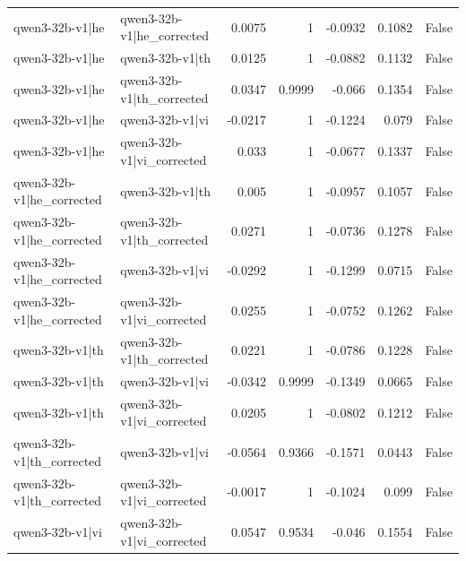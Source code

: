 \begin{table}
\begin{tabular}{l l r r r r l}
qwen3-32b-v1|he & qwen3-32b-v1|he_corrected & 0.0075 & 1 & -0.0932 & 0.1082 & False \\
qwen3-32b-v1|he & qwen3-32b-v1|th & 0.0125 & 1 & -0.0882 & 0.1132 & False \\
qwen3-32b-v1|he & qwen3-32b-v1|th_corrected & 0.0347 & 0.9999 & -0.066 & 0.1354 & False \\
qwen3-32b-v1|he & qwen3-32b-v1|vi & -0.0217 & 1 & -0.1224 & 0.079 & False \\
qwen3-32b-v1|he & qwen3-32b-v1|vi_corrected & 0.033 & 1 & -0.0677 & 0.1337 & False \\
qwen3-32b-v1|he_corrected & qwen3-32b-v1|th & 0.005 & 1 & -0.0957 & 0.1057 & False \\
qwen3-32b-v1|he_corrected & qwen3-32b-v1|th_corrected & 0.0271 & 1 & -0.0736 & 0.1278 & False \\
qwen3-32b-v1|he_corrected & qwen3-32b-v1|vi & -0.0292 & 1 & -0.1299 & 0.0715 & False \\
qwen3-32b-v1|he_corrected & qwen3-32b-v1|vi_corrected & 0.0255 & 1 & -0.0752 & 0.1262 & False \\
qwen3-32b-v1|th & qwen3-32b-v1|th_corrected & 0.0221 & 1 & -0.0786 & 0.1228 & False \\
qwen3-32b-v1|th & qwen3-32b-v1|vi & -0.0342 & 0.9999 & -0.1349 & 0.0665 & False \\
qwen3-32b-v1|th & qwen3-32b-v1|vi_corrected & 0.0205 & 1 & -0.0802 & 0.1212 & False \\
qwen3-32b-v1|th_corrected & qwen3-32b-v1|vi & -0.0564 & 0.9366 & -0.1571 & 0.0443 & False \\
qwen3-32b-v1|th_corrected & qwen3-32b-v1|vi_corrected & -0.0017 & 1 & -0.1024 & 0.099 & False \\
qwen3-32b-v1|vi & qwen3-32b-v1|vi_corrected & 0.0547 & 0.9534 & -0.046 & 0.1554 & False \\
\bottomrule
\end{tabular}
\end{table}
